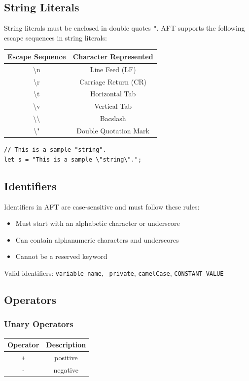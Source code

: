 \subsection{String Literals}
String literals must be enclosed in double quotes \texttt{"}. AFT supports the following escape sequences in string literals:

\begin{table}[h]
    \centering
    \begin{tabular}{cc}
        Escape Sequence & Character Represented \\
        \hline
        \textbackslash n & Line Feed (LF) \\
        \textbackslash r & Carriage Return (CR) \\
        \textbackslash t & Horizontal Tab \\
        \textbackslash v & Vertical Tab \\
        \textbackslash\textbackslash & Bacslash \\
        \textbackslash" & Double Quotation Mark \\
        \hline
    \end{tabular}
\end{table}

\begin{verbatim}
// This is a sample "string".
let s = "This is a sample \"string\".";
\end{verbatim}

\subsection{Identifiers}
Identifiers in AFT are case-sensitive and must follow these rules:
\begin{itemize}
    \item Must start with an alphabetic character or underscore
    \item Can contain alphanumeric characters and underscores
    \item Cannot be a reserved keyword
\end{itemize}

Valid identifiers: \texttt{variable_name}, \texttt{_private}, \texttt{camelCase}, \texttt{CONSTANT_VALUE}

\subsection{Operators}
\subsubsection{Unary Operators}
\begin{table}[H]
    \centering
    \begin{tabular}{cc}
        \toprule
        \textbf{Operator} & \textbf{Description} \\
        \midrule
        \texttt{+} & positive \\
        \texttt{-} & negative \\
        \bottomrule
    \end{tabular}
\end{table}
